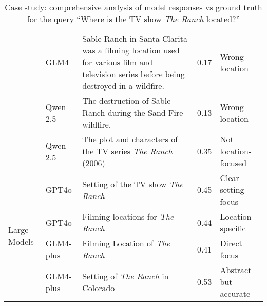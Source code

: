 \begin{table}[htbp]
\begin{tabular}{|l|l|p{6cm}|c|l|}
\cline{2-5}
& GLM4 & Sable Ranch in Santa Clarita was a filming location used for various film and television series before being destroyed in a wildfire. & 0.17 & Wrong location \\
\cline{2-5}
& Qwen 2.5 & The destruction of Sable Ranch during the Sand Fire wildfire. & 0.13 & Wrong location \\
\cline{2-5}
& Qwen 2.5 & The plot and characters of the TV series \textit{The Ranch} (2006) & 0.35 & Not location-focused \\
\hline
\multirow{4}{*}{Large Models} & GPT4o & Setting of the TV show \textit{The Ranch} & 0.45 & Clear setting focus \\
\cline{2-5}
& GPT4o & Filming locations for \textit{The Ranch} & 0.44 & Location specific \\
\cline{2-5}
& GLM4-plus & Filming Location of \textit{The Ranch} & 0.41 & Direct focus \\
\cline{2-5}
& GLM4-plus & Setting of \textit{The Ranch} in Colorado & 0.53 & Abstract but accurate \\
\hline
\end{tabular}
\caption{Case study: comprehensive analysis of model responses vs ground truth for the query ``Where is the TV show \textit{The Ranch} located?''}
\label{tab:combined-analysis}
\end{table}

